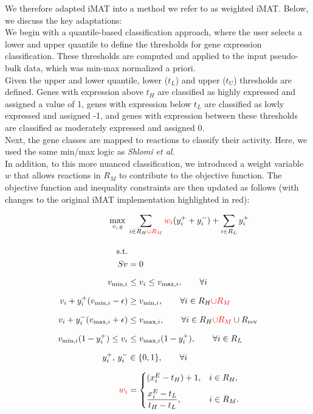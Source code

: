 We therefore adapted iMAT into a method we refer to as weighted iMAT. Below, we discuss the key adaptations:
\\

We begin with a quantile-based classification approach, where the user selects a lower and upper quantile to define the thresholds for gene expression classification.
These thresholds are computed and applied to the input pseudo-bulk data, which was min-max normalized a priori.  
\\

Given the upper and lower quantile, lower ($t_L$) and upper ($t_U$) thresholds are defined.
Genes with  expression above $t_H$ are classified as highly expressed and assigned a value of 1, genes with expression  below $t_L$ are classified as lowly expressed and assigned -1, and genes with expression between these thresholds are classified as moderately expressed and assigned 0.
\\

Next, the gene classes are mapped to reactions to classify their activity. Here, we used the same min/max logic as \textit{Shlomi et al.}
\\

In addition, to this more nuanced classification, we introduced a weight variable $w$ that allows reactions in $R_M$ to contribute to the objective function. The objective function and inequality constraints are then updated as follows (with changes to the original iMAT implementation highlighted in red):


\begin{equation}
    \label{eq:weighted_iMAT}
    \begin{aligned}
    \max_{v,\,y} \;&
        \sum_{i \in R_H \textcolor{red}{\cup R_M}} \textcolor{red}{w_i} (y_i^{+} + y_i^{-})
        + \sum_{i \in R_L} y_i^{+}
    \\[10pt]
    \text{s.t.}& \\ 
    S v &= 0
    \\[6pt]
    v_{\min,i} &\le v_i \le v_{\max,i},
    \qquad \forall i
    \\[6pt]
    v_i + y_i^{+}(v_{\min,i} - \epsilon)
        &\ge v_{\min,i},
        \qquad \forall i \in R_H \textcolor{red}{ \cup R_M}
    \\[6pt]
    v_i + y_i^{-}(v_{\max,i} + \epsilon)
        &\le v_{\max,i},
        \qquad \forall i \in R_H \textcolor{red}{\cup R_M} \cup R_{\mathrm{rev}}
    \\[6pt]
    v_{\min,i}(1 - y_i^{+})
        \le v_i &\le
        v_{\max,i}(1 - y_i^{+}),
        \qquad \forall i \in R_L
    \\[6pt]
    y_i^{+},\, y_i^{-} &\in \{0,1\},
    \qquad \forall i
    \\[6pt]
    \textcolor{red}{w_i} &=
    \begin{cases}
        (x_i^E - t_H) + 1, & i \in R_H, \\[6pt]
        \dfrac{x_i^E - t_L}{t_H - t_L}, & i \in R_M.
    \end{cases}
\end{aligned}
\end{equation}

